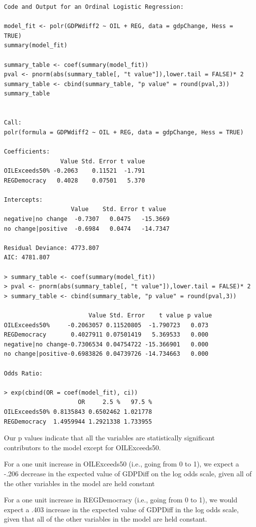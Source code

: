 \documentclass[12pt,letterpaper]{article}
\begin{document}
\begin{enumerate}
 \begin{verbatim}
Code and Output for an Ordinal Logistic Regression:

model_fit <- polr(GDPWdiff2 ~ OIL + REG, data = gdpChange, Hess = TRUE)
summary(model_fit)

summary_table <- coef(summary(model_fit))
pval <- pnorm(abs(summary_table[, "t value"]),lower.tail = FALSE)* 2
summary_table <- cbind(summary_table, "p value" = round(pval,3))
summary_table


Call:
polr(formula = GDPWdiff2 ~ OIL + REG, data = gdpChange, Hess = TRUE)

Coefficients:
                Value Std. Error t value
OILExceeds50% -0.2063    0.11521  -1.791
REGDemocracy   0.4028    0.07501   5.370

Intercepts:
                   Value    Std. Error t value 
negative|no change  -0.7307   0.0475   -15.3669
no change|positive  -0.6984   0.0474   -14.7347

Residual Deviance: 4773.807 
AIC: 4781.807 

> summary_table <- coef(summary(model_fit))
> pval <- pnorm(abs(summary_table[, "t value"]),lower.tail = FALSE)* 2
> summary_table <- cbind(summary_table, "p value" = round(pval,3))

                        Value Std. Error    t value p value
OILExceeds50%     -0.2063057 0.11520805  -1.790723   0.073
REGDemocracy       0.4027911 0.07501419   5.369533   0.000
negative|no change-0.7306534 0.04754722 -15.366901   0.000
no change|positive-0.6983826 0.04739726 -14.734663   0.000

Odds Ratio:

> exp(cbind(OR = coef(model_fit), ci))
                     OR     2.5 %   97.5 %
OILExceeds50% 0.8135843 0.6502462 1.021778
REGDemocracy  1.4959944 1.2921338 1.733955

 \end{verbatim}

Our p values indicate that all the variables are statistically significant contributors to the model except for OILExceeds50.

For a one unit increase in OILExceeds50 (i.e., going from 0 to 1), we expect a -.206
decrease in the expected value of GDPDiff on the log odds scale, given all of the 
other variables in the model are held constant

For a one unit increase in REGDemocracy (i.e., going from 0 to 1), we would expect 
a .403 increase in the expected value of GDPDiff in the log odds scale, 
given that all of the other variables in the model are held constant.


	
	
\end{enumerate}
\vspace{.25cm}
\end{document}
